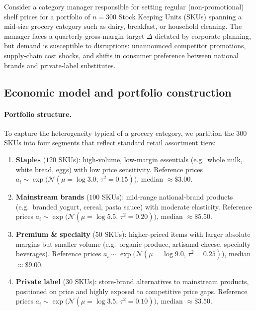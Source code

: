 \documentclass[11pt, a4paper]{article}
\theoremstyle{plain}
\theoremstyle{definition}
\theoremstyle{remark}
\begin{document}
Consider a category manager responsible for setting regular (non-promotional) shelf prices for
a portfolio of $n=300$ Stock Keeping Units (SKUs) spanning a mid-size grocery category such as
dairy, breakfast, or household cleaning. The manager faces a quarterly gross-margin target
$\Delta$ dictated by corporate planning, but demand is susceptible to disruptions: unannounced
competitor promotions, supply-chain cost shocks, and shifts in consumer preference between
national brands and private-label substitutes.

\subsection{Economic model and portfolio construction}
\label{subsec:case_model}

\paragraph{Portfolio structure.}
To capture the heterogeneity typical of a grocery category, we partition the $300$ SKUs into
four segments that reflect standard retail assortment tiers:

\begin{enumerate}
\item \textbf{Staples} ($120$ SKUs): high-volume, low-margin essentials (e.g.\ whole milk,
  white bread, eggs) with low price sensitivity. Reference prices
  $a_i\sim\exp\bigl(\mathcal N(\mu{=}\log 3.0,\,\tau^2{=}0.15)\bigr)$, median $\approx\$3.00$.
\item \textbf{Mainstream brands} ($100$ SKUs): mid-range national-brand products (e.g.\
  branded yogurt, cereal, pasta sauce) with moderate elasticity. Reference prices
  $a_i\sim\exp\bigl(\mathcal N(\mu{=}\log 5.5,\,\tau^2{=}0.20)\bigr)$, median $\approx\$5.50$.
\item \textbf{Premium \& specialty} ($50$ SKUs): higher-priced items with larger absolute
  margins but smaller volume (e.g.\ organic produce, artisanal cheese, specialty beverages).
  Reference prices $a_i\sim\exp\bigl(\mathcal N(\mu{=}\log 9.0,\,\tau^2{=}0.25)\bigr)$, median $\approx\$9.00$.
\item \textbf{Private label} ($30$ SKUs): store-brand alternatives to mainstream products,
  positioned on price and highly exposed to competitive price gaps. Reference prices
  $a_i\sim\exp\bigl(\mathcal N(\mu{=}\log 3.5,\,\tau^2{=}0.10)\bigr)$, median $\approx\$3.50$.
\end{enumerate}
\end{document}
